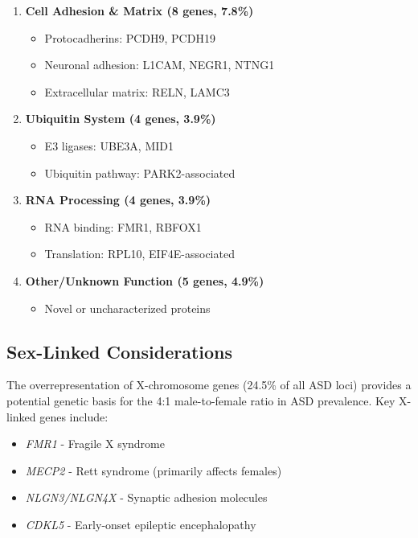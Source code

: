 \documentclass[12pt]{article}
\begin{document}
\begin{enumerate}
\item \textbf{Cell Adhesion \& Matrix (8 genes, 7.8\%)}
   \begin{itemize}
   \item Protocadherins: PCDH9, PCDH19
   \item Neuronal adhesion: L1CAM, NEGR1, NTNG1
   \item Extracellular matrix: RELN, LAMC3
   \end{itemize}

\item \textbf{Ubiquitin System (4 genes, 3.9\%)}
   \begin{itemize}
   \item E3 ligases: UBE3A, MID1
   \item Ubiquitin pathway: PARK2-associated
   \end{itemize}

\item \textbf{RNA Processing (4 genes, 3.9\%)}
   \begin{itemize}
   \item RNA binding: FMR1, RBFOX1
   \item Translation: RPL10, EIF4E-associated
   \end{itemize}

\item \textbf{Other/Unknown Function (5 genes, 4.9\%)}
   \begin{itemize}
   \item Novel or uncharacterized proteins
   \end{itemize}
\end{enumerate}

\subsection{Sex-Linked Considerations}
The overrepresentation of X-chromosome genes (24.5\% of all ASD loci) provides a potential genetic basis for the 4:1 male-to-female ratio in ASD prevalence. Key X-linked genes include:
\begin{itemize}
\item \textit{FMR1} - Fragile X syndrome
\item \textit{MECP2} - Rett syndrome (primarily affects females)
\item \textit{NLGN3/NLGN4X} - Synaptic adhesion molecules
\item \textit{CDKL5} - Early-onset epileptic encephalopathy
\end{itemize}
\end{document}
